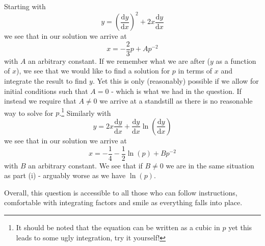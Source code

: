\documentclass{article}
\begin{document}
\quad Starting with
\begin{equation*}
y = \left(\frac{\mathrm{d}y}{\mathrm{d}x} \right)^2 + 2x \frac{\mathrm{d}y}{\mathrm{d}x}
\end{equation*}
we see that in our solution we arrive at
\begin{equation*}
x = -\frac{2}{3}p+Ap^{-2}
\end{equation*}
with $A$ an arbitrary constant. If we remember what we are after ($y$ as a function of $x$), we see that we would like to find a solution for $p$ in terms of $x$ and integrate the result to find $y$. Yet this is only (reasonably) possible if we allow for initial conditions such that $A=0$ - which is what we had in the question. If instead we require that $A \neq 0$ we arrive at a standstill as there is no reasonable way to solve for $p$.\footnote{It should be noted that the equation can be written as a cubic in $p$ yet this leads to some ugly integration, try it yourself!} 
Similarly with
\begin{equation*}
y=2x \frac{\mathrm{d}y}{\mathrm{d}x} + \frac{\mathrm{d}y}{\mathrm{d}x} \ln \left(\frac{\mathrm{d}y}{\mathrm{d}x}\right)
\end{equation*}
we see that in our solution we arrive at
\begin{equation*}
x = -\frac{1}{4} - \frac{1}{2}\ln(p) + Bp^{-2}
\end{equation*}
with $B$ an arbitrary constant. We see that if $B\neq 0$ we are in the same situation as part (i) - arguably worse as we have $\ln(p)$.\par

\quad Overall, this question is accessible to all those who can follow instructions, comfortable with integrating factors and smile as everything falls into place.
\end{document}
